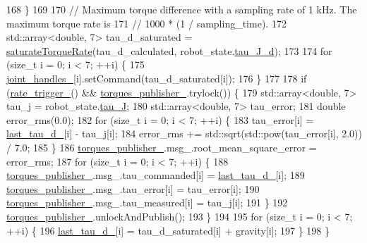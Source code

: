 \begin{DoxyCode}
168   \}
169 
170   \textcolor{comment}{// Maximum torque difference with a sampling rate of 1 kHz. The maximum torque rate is}
171   \textcolor{comment}{// 1000 * (1 / sampling\_time).}
172   std::array<double, 7> tau\_d\_saturated = \hyperlink{classfranka__example__controllers_1_1JointImpedanceExampleController_a246799d505d7ebedb1c75d8e9f251a01}{saturateTorqueRate}(tau\_d\_calculated, 
      robot\_state.\hyperlink{structfranka_1_1RobotState_a7086a89a2705810f93a3a95d43df2d9d}{tau\_J\_d});
173 
174   \textcolor{keywordflow}{for} (\textcolor{keywordtype}{size\_t} i = 0; i < 7; ++i) \{
175     \hyperlink{classfranka__example__controllers_1_1JointImpedanceExampleController_a64340fe9c37cfbdacac36129ef8f1504}{joint\_handles\_}[i].setCommand(tau\_d\_saturated[i]);
176   \}
177 
178   \textcolor{keywordflow}{if} (\hyperlink{classfranka__example__controllers_1_1JointImpedanceExampleController_afd6d8f3ae121ae1251c5053557f242a3}{rate\_trigger\_}() && \hyperlink{classfranka__example__controllers_1_1JointImpedanceExampleController_a7853d80a8b3a142be8825e895a70d20d}{torques\_publisher\_}.trylock()) \{
179     std::array<double, 7> tau\_j = robot\_state.\hyperlink{structfranka_1_1RobotState_ad90e2518d661da0d8fa4c864bae210e5}{tau\_J};
180     std::array<double, 7> tau\_error;
181     \textcolor{keywordtype}{double} error\_rms(0.0);
182     \textcolor{keywordflow}{for} (\textcolor{keywordtype}{size\_t} i = 0; i < 7; ++i) \{
183       tau\_error[i] = \hyperlink{classfranka__example__controllers_1_1JointImpedanceExampleController_a2dfeef688b321513975733e45d387bdb}{last\_tau\_d\_}[i] - tau\_j[i];
184       error\_rms += std::sqrt(std::pow(tau\_error[i], 2.0)) / 7.0;
185     \}
186     \hyperlink{classfranka__example__controllers_1_1JointImpedanceExampleController_a7853d80a8b3a142be8825e895a70d20d}{torques\_publisher\_}.msg\_.root\_mean\_square\_error = error\_rms;
187     \textcolor{keywordflow}{for} (\textcolor{keywordtype}{size\_t} i = 0; i < 7; ++i) \{
188       \hyperlink{classfranka__example__controllers_1_1JointImpedanceExampleController_a7853d80a8b3a142be8825e895a70d20d}{torques\_publisher\_}.msg\_.tau\_commanded[i] = \hyperlink{classfranka__example__controllers_1_1JointImpedanceExampleController_a2dfeef688b321513975733e45d387bdb}{last\_tau\_d\_}[i];
189       \hyperlink{classfranka__example__controllers_1_1JointImpedanceExampleController_a7853d80a8b3a142be8825e895a70d20d}{torques\_publisher\_}.msg\_.tau\_error[i] = tau\_error[i];
190       \hyperlink{classfranka__example__controllers_1_1JointImpedanceExampleController_a7853d80a8b3a142be8825e895a70d20d}{torques\_publisher\_}.msg\_.tau\_measured[i] = tau\_j[i];
191     \}
192     \hyperlink{classfranka__example__controllers_1_1JointImpedanceExampleController_a7853d80a8b3a142be8825e895a70d20d}{torques\_publisher\_}.unlockAndPublish();
193   \}
194 
195   \textcolor{keywordflow}{for} (\textcolor{keywordtype}{size\_t} i = 0; i < 7; ++i) \{
196     \hyperlink{classfranka__example__controllers_1_1JointImpedanceExampleController_a2dfeef688b321513975733e45d387bdb}{last\_tau\_d\_}[i] = tau\_d\_saturated[i] + gravity[i];
197   \}
198 \}
\end{DoxyCode}
